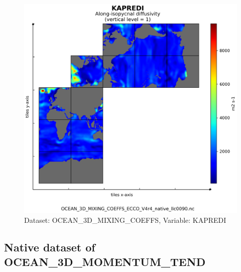 \begin{figure}[H]
\centering
\includegraphics[scale=0.55]{../images/plots/v4r4/native_plots/Ocean_3D_Gent-Mcwilliams_Redi_and_Background_Vertical_Diffusivity_Coefficients_for_the_Lat-Lon-Cap_90_(llc90)_Native_Model_Grid_(Version_4_Release_4)/KAPREDI.png}
\caption{Dataset: OCEAN\_3D\_MIXING\_COEFFS, Variable: KAPREDI}
\label{tab:table-OCEAN_3D_MIXING_COEFFS_KAPREDI-Plot}
\end{figure}
\newpage
\subsection{Native dataset of OCEAN\_3D\_MOMENTUM\_TEND}
\newp
